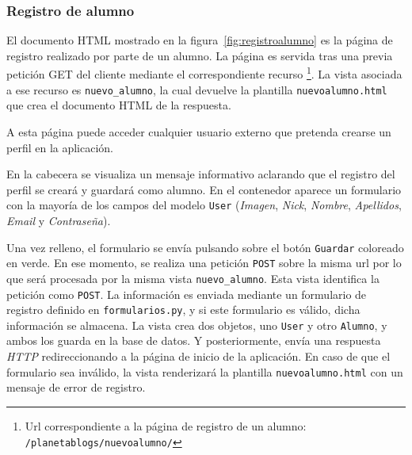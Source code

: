 \documentclass[a4paper, 12pt]{book}
\begin{document}
\subsubsection{Registro de alumno} 
\label{sec:registroalumno}
El documento HTML mostrado en la figura~\ref{fig:registroalumno} es la p\'agina de registro realizado por parte de un alumno. La p\'agina es servida 
tras una previa petici\'on GET del cliente mediante el correspondiente recurso \footnote{Url correspondiente a la p\'agina de registro de un alumno: 
\texttt{/planetablogs/nuevoalumno/}}. La vista asociada a ese recurso es \texttt{nuevo\_alumno}, la cual devuelve la plantilla \texttt{nuevoalumno.html} 
que crea el documento HTML de la respuesta.

A esta p\'agina puede acceder cualquier usuario externo que pretenda crearse un perfil en la aplicaci\'on.

En la cabecera se visualiza un mensaje informativo aclarando que el registro del perfil se crear\'a y guardar\'a como alumno. En el contenedor aparece un
formulario con la mayor\'ia de los campos del modelo \texttt{User} (\textit{Imagen}, \textit{Nick}, \textit{Nombre}, \textit{Apellidos}, \textit{Email} y 
\textit{Contrase\~na}).

Una vez relleno, el formulario se env\'ia pulsando sobre el bot\'on \texttt{Guardar} coloreado en verde. En ese momento, se realiza una petici\'on 
\texttt{POST} sobre la misma url por lo que ser\'a procesada por la misma vista \texttt{nuevo\_alumno}. Esta vista identifica la petici\'on como 
\texttt{POST}. La informaci\'on es enviada mediante un formulario de registro definido en \texttt{formularios.py}, y si este formulario es v\'alido, dicha
informaci\'on se almacena. La vista crea dos objetos, uno \texttt{User} y otro \texttt{Alumno}, y ambos los guarda en la base de datos. Y posteriormente, 
env\'ia una respuesta \textit{HTTP} redireccionando a la p\'agina de inicio de la aplicaci\'on. En caso de que el formulario sea inv\'alido, la vista 
renderizar\'a la plantilla \texttt{nuevoalumno.html} con un mensaje de error de registro.
\end{document}

